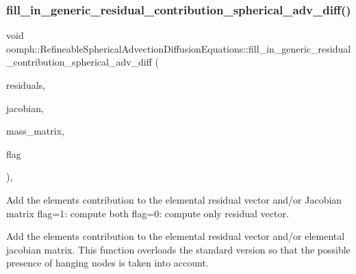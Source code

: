 \mbox{\label{classoomph_1_1RefineableSphericalAdvectionDiffusionEquations_a08a48e0e7e544ec61f4adde6c5e41211}} 
\subsubsection{\texorpdfstring{fill\+\_\+in\+\_\+generic\+\_\+residual\+\_\+contribution\+\_\+spherical\+\_\+adv\+\_\+diff()}{fill\_in\_generic\_residual\_contribution\_spherical\_adv\_diff()}}
{\footnotesize\ttfamily void oomph\+::\+Refineable\+Spherical\+Advection\+Diffusion\+Equations\+::fill\+\_\+in\+\_\+generic\+\_\+residual\+\_\+contribution\+\_\+spherical\+\_\+adv\+\_\+diff (\begin{DoxyParamCaption}\item[{\hyperlink{classoomph_1_1Vector}{Vector}$<$ double $>$ \&}]{residuals,  }\item[{\hyperlink{classoomph_1_1DenseMatrix}{Dense\+Matrix}$<$ double $>$ \&}]{jacobian,  }\item[{\hyperlink{classoomph_1_1DenseMatrix}{Dense\+Matrix}$<$ double $>$ \&}]{mass\+\_\+matrix,  }\item[{unsigned}]{flag }\end{DoxyParamCaption})\hspace{0.3cm}{\ttfamily [protected]}, {\ttfamily [virtual]}}



Add the element\textquotesingle{}s contribution to the elemental residual vector and/or Jacobian matrix flag=1\+: compute both flag=0\+: compute only residual vector. 

Add the element\textquotesingle{}s contribution to the elemental residual vector and/or elemental jacobian matrix. This function overloads the standard version so that the possible presence of hanging nodes is taken into account. 

